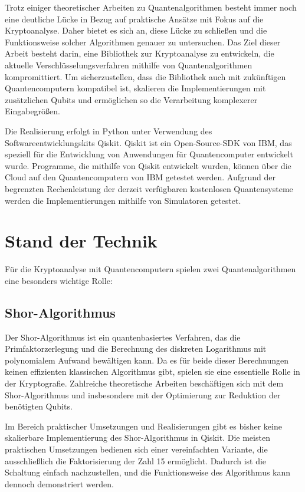 \documentclass[
  a4paper, %
  10pt, %
  unnumberedsections, %
  twoside, %
]{LTJournalArticle}
\begin{document}
Trotz einiger theoretischer Arbeiten zu Quantenalgorithmen
besteht immer noch eine deutliche Lücke in Bezug auf praktische Ansätze mit Fokus auf die Kryptoanalyse.
Daher bietet es sich an, diese Lücke zu schließen und die Funktionsweise solcher Algorithmen genauer zu untersuchen.
Das Ziel dieser Arbeit besteht darin, eine Bibliothek zur Kryptoanalyse zu entwickeln,
die aktuelle Verschlüsselungsverfahren mithilfe von Quantenalgorithmen kompromittiert.
Um sicherzustellen, dass die Bibliothek auch mit zukünftigen Quantencomputern kompatibel ist,
skalieren die Implementierungen mit zusätzlichen Qubits und
ermöglichen so die Verarbeitung komplexerer Eingabegrößen.

Die Realisierung erfolgt in Python unter Verwendung des Softwareentwicklungskits Qiskit.
Qiskit ist ein Open-Source-SDK von IBM,
das speziell für die Entwicklung von Anwendungen für Quantencomputer entwickelt wurde.
Programme, die mithilfe von Qiskit entwickelt wurden,
können über die Cloud auf den Quantencomputern von IBM getestet werden.
Aufgrund der begrenzten Rechenleistung der derzeit verfügbaren kostenlosen Quantensysteme
werden die Implementierungen mithilfe von Simulatoren getestet.



\section{Stand der Technik}

Für die Kryptoanalyse mit Quantencomputern spielen zwei Quantenalgorithmen eine besonders wichtige Rolle:

\subsection{Shor-Algorithmus}
Der Shor-Algorithmus ist ein quantenbasiertes Verfahren,
das die Primfaktorzerlegung und die Berechnung des diskreten Logarithmus
mit polynomialem Aufwand bewältigen kann.
Da es für beide dieser Berechnungen keinen effizienten klassischen Algorithmus gibt,
spielen sie eine essentielle Rolle in der Kryptografie\autocite{Shor:1997}.
Zahlreiche theoretische Arbeiten beschäftigen sich mit dem Shor-Algorithmus und
insbesondere mit der Optimierung zur Reduktion der benötigten Qubits.

Im Bereich praktischer Umsetzungen und Realisierungen
gibt es bisher keine skalierbare Implementierung des Shor-Algorithmus in Qiskit.
Die meisten praktischen Umsetzungen bedienen sich einer vereinfachten Variante,
die ausschließlich die Faktorisierung der Zahl 15 ermöglicht.
Dadurch ist die Schaltung einfach nachzustellen,
und die Funktionsweise des Algorithmus kann dennoch demonstriert werden\autocite{9376169, Monz_2016, IBM:Shor}.
\end{document}
